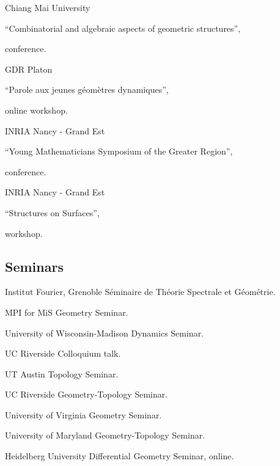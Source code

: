 {Chiang Mai University}
{``Combinatorial and algebraic aspects of geometric structures'', \begin{footnotesize}
		conference.
	\end{footnotesize}}
{}

{GDR Platon}
{``Parole aux jeunes g\'eom\`etres dynamiques'', 
	\begin{footnotesize}
		online workshop.
	\end{footnotesize}}
{}

{INRIA Nancy - Grand Est}
{``Young Mathematicians Symposium of the Greater Region'', \begin{footnotesize}
		conference.
\end{footnotesize}}
{}

{INRIA Nancy - Grand Est}
{``Structures on Surfaces'', \begin{footnotesize}
		workshop.
\end{footnotesize}}
{}

\subsection{Seminars}

{Institut Fourier, Grenoble}
{S\'eminaire de Th\'eorie Spectrale et G\'eom\'etrie.}
{}

{MPI for MiS}
{Geometry Seminar.}
{}

{University of Wisconsin-Madison}
{Dynamics Seminar.}
{}

{UC Riverside}
{Colloquium talk.}
{}

{UT Austin}
{Topology Seminar.}
{}

{UC Riverside}
{Geometry-Topology Seminar.}
{}

{University of Virginia}
{Geometry Seminar.}
{}

{University of Maryland}
{Geometry-Topology Seminar.}
{}

{Heidelberg University}
{Differential Geometry Seminar, online.}
{}

